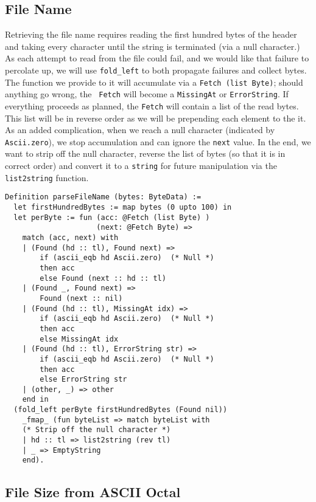 \documentclass[nocopyrightspace]{sigplanconf}
\begin{document}
\subsection{File Name}

Retrieving the file name requires reading the first hundred bytes of the
header and taking every character until the string is terminated (via a null
character.) As each attempt to read from the file could fail, and we would
like that failure to percolate up, we will use {\tt fold\_left} to both
propagate failures and collect bytes. The function we provide to it will
accumulate via a {\tt Fetch (list Byte)}; should anything go wrong, the {\tt
Fetch} will become a {\tt MissingAt} or {\tt ErrorString}. If everything
proceeds as planned, the {\tt Fetch} will contain a list of the read bytes.
This list will be in reverse order as we will be prepending each element to
the it. As an added complication, when we reach a null character (indicated by
{\tt Ascii.zero}), we stop accumulation and can ignore the {\tt next} value.
In the end, we want to strip off the null character, reverse the list of bytes
(so that it is in correct order) and convert it to a {\tt string} for future
manipulation via the {\tt list2string} function.

\begin{lstlisting}
Definition parseFileName (bytes: ByteData) :=
  let firstHundredBytes := map bytes (0 upto 100) in
  let perByte := fun (acc: @Fetch (list Byte) )
                     (next: @Fetch Byte) =>
    match (acc, next) with
    | (Found (hd :: tl), Found next) =>
        if (ascii_eqb hd Ascii.zero)  (* Null *)
        then acc
        else Found (next :: hd :: tl)
    | (Found _, Found next) =>
        Found (next :: nil)
    | (Found (hd :: tl), MissingAt idx) =>
        if (ascii_eqb hd Ascii.zero)  (* Null *)
        then acc
        else MissingAt idx
    | (Found (hd :: tl), ErrorString str) =>
        if (ascii_eqb hd Ascii.zero)  (* Null *)
        then acc
        else ErrorString str
    | (other, _) => other
    end in
  (fold_left perByte firstHundredBytes (Found nil)) 
    _fmap_ (fun byteList => match byteList with
    (* Strip off the null character *)
    | hd :: tl => list2string (rev tl)
    | _ => EmptyString
    end).
\end{lstlisting}


\subsection{File Size from ASCII Octal}
\end{document}
